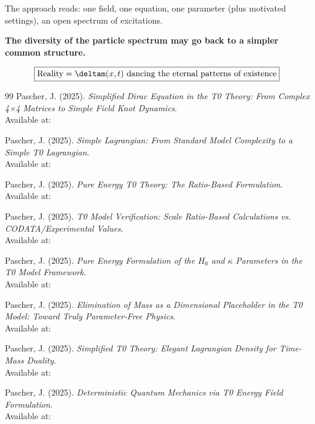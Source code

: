 	The approach reads: one field, one equation, one parameter (plus motivated settings), an open spectrum of excitations.
	
	\textbf{The diversity of the particle spectrum may go back to a simpler common structure.}
	
	\begin{equation}
		\boxed{\text{Reality} = \deltam(x,t) \text{ dancing the eternal patterns of existence}}
		\label{eq:final_truth}
	\end{equation}
	
	\begin{thebibliography}{99}
		Pascher, J. (2025). \textit{Simplified Dirac Equation in the T0 Theory: From Complex 4×4 Matrices to Simple Field Knot Dynamics}. \\
		Available at: 
		
		Pascher, J. (2025). \textit{Simple Lagrangian: From Standard Model Complexity to a Simple T0 Lagrangian}. \\
		Available at: 
		
		Pascher, J. (2025). \textit{Pure Energy T0 Theory: The Ratio-Based Formulation}. \\
		Available at: 
		
		Pascher, J. (2025). \textit{T0 Model Verification: Scale Ratio-Based Calculations vs. CODATA/Experimental Values}. \\
		Available at: 
		
		Pascher, J. (2025). \textit{Pure Energy Formulation of the $H_0$ and $\kappa$ Parameters in the T0 Model Framework}. \\
		Available at: 
		
		Pascher, J. (2025). \textit{Elimination of Mass as a Dimensional Placeholder in the T0 Model: Toward Truly Parameter-Free Physics}. \\
		Available at: 
		
		Pascher, J. (2025). \textit{Simplified T0 Theory: Elegant Lagrangian Density for Time-Mass Duality}. \\
		Available at: 
		
		Pascher, J. (2025). \textit{Deterministic Quantum Mechanics via T0 Energy Field Formulation}. \\
		Available at: 
		

\end{thebibliography}
